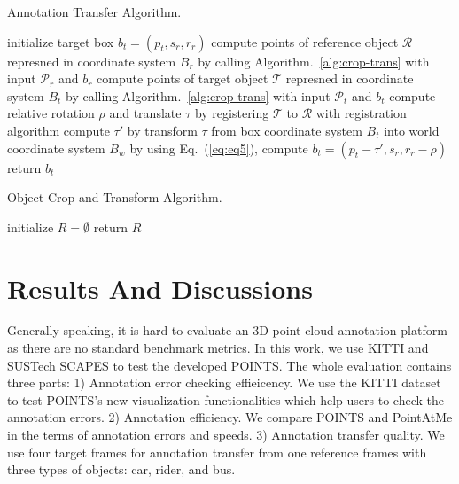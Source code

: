\documentclass[letterpaper, 10 pt, conference]{ieeeconf}  %
\begin{document}
\begin{algorithm}
	\caption{Annotation Transfer Algorithm.}
	\label{alg:anno-trans}
	
	\SetAlgoLined
	
	\nl initialize target box $b_t = (p_t,s_r,r_r)$\;
	\nl compute points of reference object $\mathcal{R}$ represned in coordinate system $B_r$ by calling Algorithm.~\ref{alg:crop-trans} with input $\mathcal{P}_r$ and $b_r$\;
	\nl compute points of target object $\mathcal{T}$ represned in coordinate system $B_t$ by calling Algorithm.~\ref{alg:crop-trans} with input $\mathcal{P}_t$ and $b_t$\;
	\nl compute relative rotation $\rho$ and translate $\tau$ by registering $\mathcal{T}$ to $\mathcal{R}$ with registration algorithm \cite{Yang2016GoICPAG} \;
	\nl compute $\tau'$ by transform $\tau$ from box coordinate system $B_t$ into world coordinate system $B_w$\;
	\nl	by using Eq.~(\ref{eq:eq5}), compute $b_t = (p_t-\tau', s_r, r_r-\rho)$\;
	\nl return $b_t$\;
	
\end{algorithm}
\begin{algorithm}
	\caption{Object Crop and Transform Algorithm.}
	\label{alg:crop-trans}
	
	\SetAlgoLined
	\nl initialize $R = \emptyset $ \;
	\nl {}
	\nl return $R$\;
	
\end{algorithm}

\section{Results And Discussions}
\label {sec:results}

Generally speaking, it is hard to evaluate an 3D point cloud annotation platform as there are no standard benchmark metrics.
In this work, we use KITTI \cite{Geiger2012CVPR} and SUSTech SCAPES to test the developed POINTS.
The whole evaluation contains three parts:
1) Annotation error checking effieicency. We use the KITTI dataset\cite{Geiger2012CVPR} to test POINTS's new visualization functionalities which help users to check the annotation errors.
2) Annotation efficiency. We compare POINTS and PointAtMe \cite{pointatme} in the terms of annotation errors and speeds.
3) Annotation transfer quality. We use four target frames for annotation transfer from one reference frames with three types of objects: car, rider, and bus.
\end{document}
